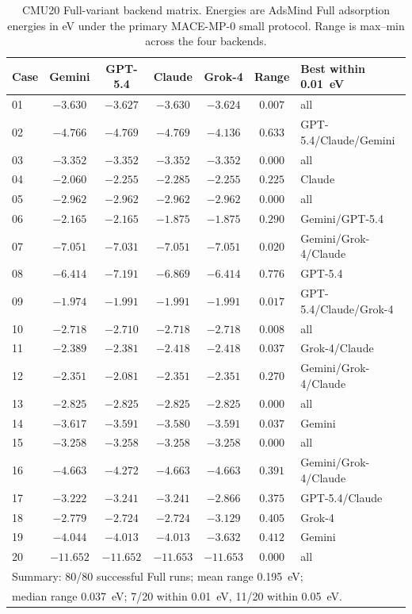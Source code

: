 \documentclass[%
 preprint,
 superscriptaddress,
 amsmath,amssymb,
 aps,
 prb,
 floatfix,
]{revtex4-2}
\begin{document}
\begin{table}[ht]
\centering
\caption{CMU20 Full-variant backend matrix. Energies are AdsMind Full adsorption energies in eV under the primary MACE-MP-0 small protocol. Range is max--min across the four backends.}
\label{tab:si-cmu20-full-backend-matrix}
\begin{tabular}{lcccccl}
\toprule
Case & Gemini & GPT-5.4 & Claude & Grok-4 & Range & Best within 0.01~eV \\
\midrule
01 & $-3.630$ & $-3.627$ & $-3.630$ & $-3.624$ & $0.007$ & all \\
02 & $-4.766$ & $-4.769$ & $-4.769$ & $-4.136$ & $0.633$ & GPT-5.4/Claude/Gemini \\
03 & $-3.352$ & $-3.352$ & $-3.352$ & $-3.352$ & $0.000$ & all \\
04 & $-2.060$ & $-2.255$ & $-2.285$ & $-2.255$ & $0.225$ & Claude \\
05 & $-2.962$ & $-2.962$ & $-2.962$ & $-2.962$ & $0.000$ & all \\
06 & $-2.165$ & $-2.165$ & $-1.875$ & $-1.875$ & $0.290$ & Gemini/GPT-5.4 \\
07 & $-7.051$ & $-7.031$ & $-7.051$ & $-7.051$ & $0.020$ & Gemini/Grok-4/Claude \\
08 & $-6.414$ & $-7.191$ & $-6.869$ & $-6.414$ & $0.776$ & GPT-5.4 \\
09 & $-1.974$ & $-1.991$ & $-1.991$ & $-1.991$ & $0.017$ & GPT-5.4/Claude/Grok-4 \\
10 & $-2.718$ & $-2.710$ & $-2.718$ & $-2.718$ & $0.008$ & all \\
11 & $-2.389$ & $-2.381$ & $-2.418$ & $-2.418$ & $0.037$ & Grok-4/Claude \\
12 & $-2.351$ & $-2.081$ & $-2.351$ & $-2.351$ & $0.270$ & Gemini/Grok-4/Claude \\
13 & $-2.825$ & $-2.825$ & $-2.825$ & $-2.825$ & $0.000$ & all \\
14 & $-3.617$ & $-3.591$ & $-3.580$ & $-3.591$ & $0.037$ & Gemini \\
15 & $-3.258$ & $-3.258$ & $-3.258$ & $-3.258$ & $0.000$ & all \\
16 & $-4.663$ & $-4.272$ & $-4.663$ & $-4.663$ & $0.391$ & Gemini/Grok-4/Claude \\
17 & $-3.222$ & $-3.241$ & $-3.241$ & $-2.866$ & $0.375$ & GPT-5.4/Claude \\
18 & $-2.779$ & $-2.724$ & $-2.724$ & $-3.129$ & $0.405$ & Grok-4 \\
19 & $-4.044$ & $-4.013$ & $-4.013$ & $-3.632$ & $0.412$ & Gemini \\
20 & $-11.652$ & $-11.652$ & $-11.653$ & $-11.653$ & $0.000$ & all \\
\midrule
\multicolumn{7}{l}{Summary: 80/80 successful Full runs; mean range 0.195~eV; } \\
\multicolumn{7}{l}{median range 0.037~eV; 7/20 within 0.01~eV, 11/20 within 0.05~eV.} \\

\bottomrule
\end{tabular}%
\end{table}
\end{document}
